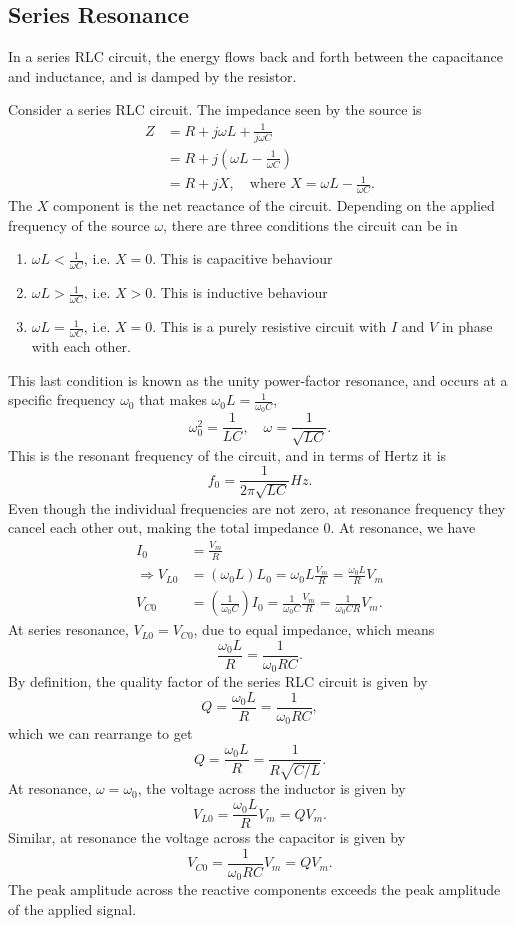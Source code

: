 \documentclass{article}
\begin{document}
\subsection{Series Resonance}
In a series RLC circuit, the energy flows back and forth between the capacitance and inductance, and is damped by the resistor.

Consider a series RLC circuit. The impedance seen by the source is
\begin{align*}
    Z &= R+j\omega L+\frac{1}{j\omega C}\\
      &= R+j \left( \omega L-\frac{1}{\omega C} \right)\\
      &= R+jX,\quad \text{where }X=\omega L-\frac{1}{\omega C}.
\end{align*}
The $X$ component is the net reactance of the circuit. Depending on the applied frequency of the source $\omega $, there are three conditions the circuit can be in
\begin{enumerate}
    \item $\omega L< \frac{1}{\omega C}$, i.e. $X=0$. This is capacitive behaviour
    \item $\omega L > \frac{1}{\omega C}$, i.e. $X>0$. This is inductive behaviour
    \item $\omega L=\frac{1}{\omega C}$, i.e. $X=0$. This is a purely resistive circuit with $I$ and $V$ in phase with each other.
\end{enumerate}
This last condition is known as the unity power-factor resonance, and occurs at a specific frequency $\omega _0$ that makes $\omega _0L=\frac{1}{\omega _0C}$,
\[
    \omega _0^2=\frac{1}{LC},\quad \omega =\frac{1}{\sqrt{LC}}.
\]
This is the resonant frequency of the circuit, and in terms of Hertz it is 
\[
    f_0=\frac{1}{2\pi \sqrt{LC}}Hz.
\]
Even though the individual frequencies are not zero, at resonance frequency they cancel each other out, making the total impedance 0. At resonance, we have
\begin{align*}
    I_0 &=\frac{V_m}{R} \\
    \Rightarrow V_{L 0}&= \left( \omega _0L \right)L_0=\omega _0L \frac{V_m}{R}=\frac{\omega _0L}{R}V_m\\
    V_{C 0}&= \left( \frac{1}{\omega _0C} \right)I_0=\frac{1}{\omega _0C}\frac{V_m}{R}=\frac{1}{\omega _0CR}V_m.
\end{align*}
At series resonance, $V_{L 0}=V_{C 0}$, due to equal impedance, which means 
\[
    \frac{\omega _0L}{R}=\frac{1}{\omega _0RC}.
\]
By definition, the quality factor of the series RLC circuit is given by 
\[
    Q=\frac{\omega _0L}{R}=\frac{1}{\omega _0RC},
\]
which we can rearrange to get 
\[
    Q=\frac{\omega _0L}{R}=\frac{1}{R\sqrt{C/L}}.
\]
At resonance, $\omega =\omega _0$, the voltage across the inductor is given by 
\[
    V_{L 0}=\frac{\omega _0L}{R}V_m=QV_m.
\]
Similar, at resonance the voltage across the capacitor is given by 
\[
    V_{C 0}=\frac{1}{\omega _0RC}V_m=QV_m.
\]
The peak amplitude across the reactive components exceeds the peak amplitude of the applied signal.
\end{document}
